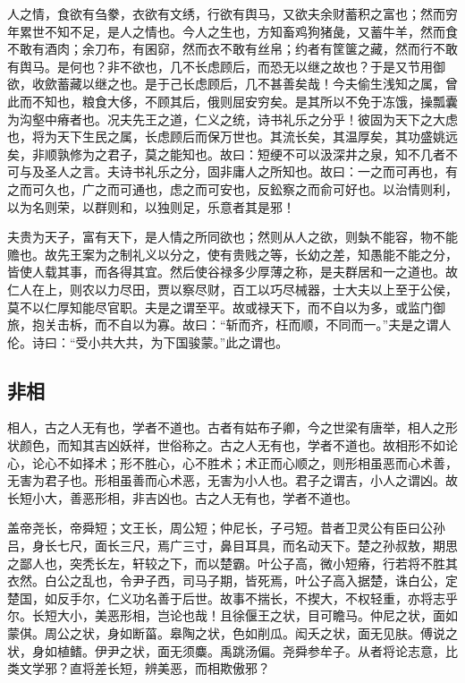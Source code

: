 \documentclass[]{article}
\begin{document}
人之情，食欲有刍豢，衣欲有文绣，行欲有舆马，又欲夫余财蓄积之富也；然而穷年累世不知不足，是人之情也。今人之生也，方知畜鸡狗猪彘，又蓄牛羊，然而食不敢有酒肉；余刀布，有囷窌，然而衣不敢有丝帛；约者有筐箧之藏，然而行不敢有舆马。是何也？非不欲也，几不长虑顾后，而恐无以继之故也？于是又节用御欲，收歛蓄藏以继之也。是于己长虑顾后，几不甚善矣哉！今夫偷生浅知之属，曾此而不知也，粮食大侈，不顾其后，俄则屈安穷矣。是其所以不免于冻饿，操瓢囊为沟壑中瘠者也。况夫先王之道，仁义之统，诗书礼乐之分乎！彼固为天下之大虑也，将为天下生民之属，长虑顾后而保万世也。其流长矣，其温厚矣，其功盛姚远矣，非顺孰修为之君子，莫之能知也。故曰：短绠不可以汲深井之泉，知不几者不可与及圣人之言。夫诗书礼乐之分，固非庸人之所知也。故曰：一之而可再也，有之而可久也，广之而可通也，虑之而可安也，反鈆察之而俞可好也。以治情则利，以为名则荣，以群则和，以独则足，乐意者其是邪！

夫贵为天子，富有天下，是人情之所同欲也；然则从人之欲，则埶不能容，物不能赡也。故先王案为之制礼义以分之，使有贵贱之等，长幼之差，知愚能不能之分，皆使人载其事，而各得其宜。然后使谷禄多少厚薄之称，是夫群居和一之道也。故仁人在上，则农以力尽田，贾以察尽财，百工以巧尽械器，士大夫以上至于公侯，莫不以仁厚知能尽官职。夫是之谓至平。故或禄天下，而不自以为多，或监门御旅，抱关击柝，而不自以为寡。故曰：``斩而齐，枉而顺，不同而一。''夫是之谓人伦。诗曰：``受小共大共，为下国骏蒙。''此之谓也。

\hypertarget{header-n28}{%
\subsection{非相}\label{header-n28}}

相人，古之人无有也，学者不道也。古者有姑布子卿，今之世梁有唐举，相人之形状颜色，而知其吉凶妖祥，世俗称之。古之人无有也，学者不道也。故相形不如论心，论心不如择术；形不胜心，心不胜术；术正而心顺之，则形相虽恶而心术善，无害为君子也。形相虽善而心术恶，无害为小人也。君子之谓吉，小人之谓凶。故长短小大，善恶形相，非吉凶也。古之人无有也，学者不道也。

盖帝尧长，帝舜短；文王长，周公短；仲尼长，子弓短。昔者卫灵公有臣曰公孙吕，身长七尺，面长三尺，焉广三寸，鼻目耳具，而名动天下。楚之孙叔敖，期思之鄙人也，突秃长左，轩较之下，而以楚霸。叶公子高，微小短瘠，行若将不胜其衣然。白公之乱也，令尹子西，司马子期，皆死焉，叶公子高入据楚，诛白公，定楚国，如反手尔，仁义功名善于后世。故事不揣长，不揳大，不权轻重，亦将志乎尔。长短大小，美恶形相，岂论也哉！且徐偃王之状，目可瞻马。仲尼之状，面如蒙倛。周公之状，身如断菑。皋陶之状，色如削瓜。闳夭之状，面无见肤。傅说之状，身如植鳍。伊尹之状，面无须麋。禹跳汤偏。尧舜参牟子。从者将论志意，比类文学邪？直将差长短，辨美恶，而相欺傲邪？
\end{document}
